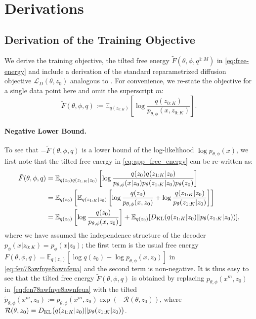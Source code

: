 \onecolumn
{}

\section{Derivations}\label{app:A}
\subsection{Derivation of the Training Objective}\label{app:reparam_diffusion}

We derive the training objective, the tilted free energy $\tilde{F}(\theta, \phi, q^{1:M})$ in \eqref{eq:free-energy}  and include a derivation of the standard reparametrized diffusion objective $\mathcal{L}_D(\theta, z_0)$ analogous to \citet{hodenoisingdiffusionprobabilistic2020, pmlr-v37-sohl-dickstein15}. For convenience, we re-state the objective for a single data point here and omit the superscript $m$:
\begin{equation}\label{eq:app_free_energy}
    \tilde{F}(\theta, \phi, q) := \mathbb{E}_{q(z_{0:K})}\left[ \log \frac{q(z_{0:K})}{p_{\theta, \phi}( x, z_{0:K})} \right].
\end{equation}

\paragraph{Negative Lower Bound.} To see that $-\tilde{F}(\theta, \phi, q)$ is a lower bound of the log-likelihood $\log p_{\theta, \phi}(x)$, we first note that the tilted free energy in \eqref{eq:app_free_energy} can be re-written as:
\begin{align*}
    \tilde{F}(\theta, \phi, q) &= \mathbb{E}_{q(z_0) q(z_{1:K}|z_0)}\left[ \log \frac{q(z_0) q(z_{1:K}|z_0)}{p_{\theta, \phi}(x|z_{0})p_\theta(z_{1:K}|z_0)p_\theta(z_0)} \right] \\
    &= \mathbb{E}_{q(z_0)}\left[ \mathbb{E}_{q(z_{1:K}|z_0)}\left[ \log \frac{q(z_0)}{p_{\theta, \phi}(x, z_0)} + \log \frac{q(z_{1:K}|z_0)}{p_\theta(z_{1:K}|z_0)} \right] \right] \\
    &= \mathbb{E}_{q(z_0)}\left[ \log \frac{q(z_0)}{p_{\theta, \phi}(x, z_0)} \right] + \mathbb{E}_{q(z_0)}[D_{\mathrm{KL}}(q(z_{1:K}|z_0) \| p_\theta(z_{1:K}|z_0))],
\end{align*}
where we have assumed the independence structure of the decoder $p_{\phi}( x|z_{0:K})=p_{\phi}( x|z_0)$; the first term is the usual free energy $F(\theta, \phi, q)=\mathbb{E}_{q(z_0)}\left[ \log {q(z_0)}-\log{p_{\theta, \phi}(x, z_0)} \right]$ in \eqref{eq:fen78awfnye8awnfeua} and the second term is non-negative. 
It is thus easy to see that the tilted free energy $\tilde{F}(\theta, \phi, q)$ is obtained by replacing $p_{\theta,\phi}(x^m,z_0)$ in~\eqref{eq:fen78awfnye8awnfeua} with the tilted $\tilde{p}_{\theta,\phi}(x^m,z_0):=p_{\theta,\phi}(x^m,z_0)\exp(-\mathcal{R}(\theta,z_0))$, where $\mathcal{R}(\theta, z_0)= D_{\mathrm{KL}}\big(q(z_{1:K}|z_{0}) \|p_{\theta}(z_{1:K}|z_{0})\big)$. 

